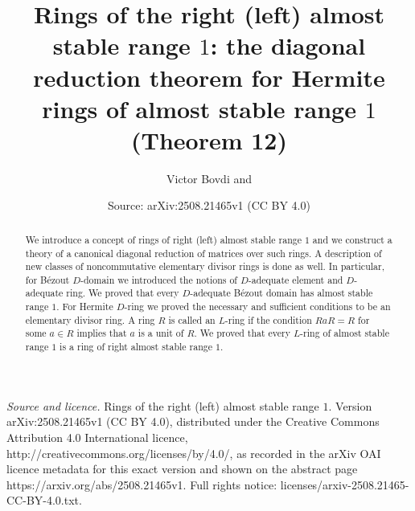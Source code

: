 \documentclass[10pt,a4paper]{amsart}
\title[almost stable range $1$]{Rings of the right (left) almost stable range $1$: the diagonal reduction theorem for Hermite rings of almost stable range $1$ (Theorem 12)}
\author{Victor Bovdi and \framebox{Bohdan Zabavsky}}
\date{Source: arXiv:2508.21465v1 (CC BY 4.0)}
\theoremstyle{plain}
\theoremstyle{definition}
\begin{document}
\begin{abstract}
We introduce a concept of  rings of right (left) almost stable range $1$ and  we construct  a theory of  a canonical diagonal reduction of matrices over such rings. A description of  new classes of noncommutative elementary divisor rings is done as well. In particular, for B\'ezout $D$-domain  we introduced the notions of $D$-adequate element and $D$-adequate ring. We proved that every $D$-adequate  B\'ezout domain has almost stable range $1$. For Hermite $D$-ring we proved the necessary and sufficient conditions to be an elementary divisor ring. A ring $R$ is called an $L$-ring if the condition $RaR = R$ for some  $a\in R$ implies that $a$ is a unit  of $R$. We proved  that every $L$-ring of almost stable range $1$ is a ring of right almost stable range $1$.
\end{abstract}
\maketitle
\noindent\emph{Source and licence.} Rings of the right (left) almost stable range $1$. Version arXiv:2508.21465v1 (CC BY 4.0), distributed under the Creative Commons Attribution 4.0 International licence, http://creativecommons.org/licenses/by/4.0/, as recorded in the arXiv OAI licence metadata for this exact version and shown on the abstract page https://arxiv.org/abs/2508.21465v1. Full rights notice: licenses/arxiv-2508.21465-CC-BY-4.0.txt.\par\smallskip
\end{document}
